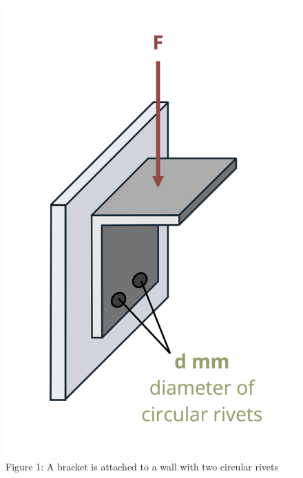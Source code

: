 \documentclass[
  letterpaper,
  DIV=11,
  numbers=noendperiod]{scrreprt}
\begin{document}
\begin{figure}[H]

{\centering \includegraphics{images/165.png}

}

\caption{Figure 1: A bracket is attached to a wall with two circular
rivets}

\end{figure}%
\end{document}
